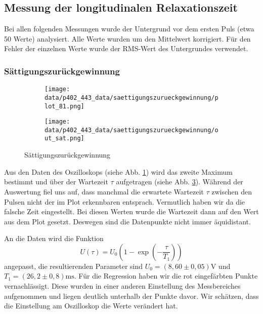 \subsection{Messung der longitudinalen Relaxationszeit}
Bei allen folgenden Messungen wurde der Untergrund vor dem ersten Puls (etwa 50 Werte) analysiert. Alle Werte wurden um den Mittelwert korrigiert. Für den Fehler der einzelnen Werte wurde der RMS-Wert des Untergrundes verwendet.
\subsubsection{Sättigungszurückgewinnung}
\begin{figure}[h]
  \begin{subfigure}[h]{0.5\textwidth}
    \centering
    \texttt{[image: data/p402\_443\_data/saettigungszurueckgewinnung/plot\_81.png]}
    \label{fig:sat_bsp}
  \end{subfigure}%
  \begin{subfigure}[h]{0.5\textwidth}
    \centering
    \texttt{[image: data/p402\_443\_data/saettigungszurueckgewinnung/out\_sat.png]}
    \label{fig:sat_data}
  \end{subfigure}
  \caption{Sättigungszurückgewinnung}
\end{figure}

Aus den Daten des Oszilloskops (siehe Abb. \ref{fig:sat_bsp}) wird das zweite Maximum bestimmt und über der Wartezeit $\tau$ aufgetragen (siehe Abb. \ref{fig:sat_data}). Während der Auswertung fiel uns auf, dass manchmal die erwartete Wartezeit $\tau$ zwischen den Pulsen nicht der im Plot erkennbaren entsprach. Vermutlich haben wir da die falsche Zeit eingestellt. Bei diesen Werten wurde die Wartezeit dann auf den Wert aus dem Plot gesetzt. Deswegen sind die Datenpunkte nicht immer äquidistant. 

An die Daten wird die Funktion $$U(\tau) = U_0\left(1-\exp{\left(-\frac{\tau}{T_1}\right)}\right)$$ angepasst, die resultierenden Parameter sind $U_0 = (8,60\pm 0,05)\si{\volt}$ und $T_1 = (26,2\pm 0,8) \si{\milli\second}$. Für die Regression haben wir die rot eingefärbten Punkte vernachlässigt. Diese wurden in einer anderen Einstellung des Messbereiches aufgenommen und liegen deutlich unterhalb der Punkte davor. Wir schätzen, dass die Einstellung am Oszilloskop die Werte verändert hat.

